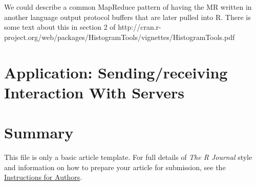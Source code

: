 We could describe a common MapReduce pattern of having the MR written
in another language output protocol buffers that are later pulled into
R.  There is some text about this in section 2 of
http://cran.r-project.org/web/packages/HistogramTools/vignettes/HistogramTools.pdf 

\section{Application: Sending/receiving Interaction With Servers}

\section{Summary}

This file is only a basic article template. For full details of \emph{The R Journal} style and information on how to prepare your article for submission, see the \href{http://journal.r-project.org/latex/RJauthorguide.pdf}{Instructions for Authors}.



\address{Dirk Eddelbuettel\\
  Debian and R Projects\\
  711 Monroe Avenue, River Forest, IL 60305\\
  USA}

\address{Author Two\\
  Affiliation\\
  Address\\
  Country}

\address{Murray Stokely\\
  Google, Inc.\\
  1600 Amphitheatre Parkway\\
  Mountain View, CA 94043\\
  USA}
